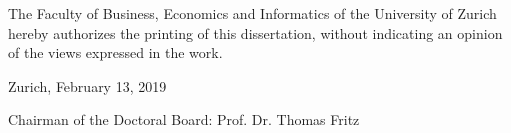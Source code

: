 

\begin{titlepage}

\setlength{\parindent}{0pt} %

\normalsize
The Faculty of Business, Economics and Informatics of the University of Zurich hereby authorizes the printing of this dissertation, without indicating an opinion of the views expressed in the work.

\vspace{3ex}
Zurich, February 13, 2019

\vspace{3ex}
Chairman of the Doctoral Board: Prof. Dr. Thomas Fritz
\newpage
\thispagestyle{empty}
\quad
\newpage
\setcounter{page}{1}

\end{titlepage}
